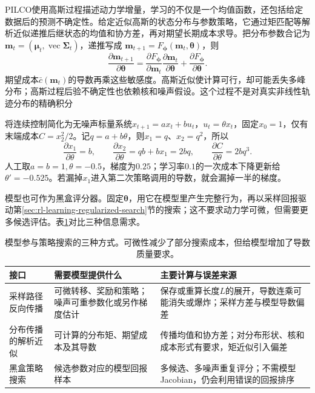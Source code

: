 PILCO使用高斯过程描述动力学增量，学习的不仅是一个均值函数，还包括给定数据后的预测不确定性。给定近似高斯的状态分布与参数策略，它通过矩匹配等解析近似递推后继状态的均值和协方差，再对期望长期成本求导。把分布参数合记为
$\bm m_t=(\bm\mu_t,\operatorname{vec}\bm\Sigma_t)$，递推写成
$\bm m_{t+1}=F_{\bm\phi}(\bm m_t,\bm\theta)$，则
\[
 \frac{\partial\bm m_{t+1}}{\partial\bm\theta}
  =\frac{\partial F_{\bm\phi}}{\partial\bm m_t}
       \frac{\partial\bm m_t}{\partial\bm\theta}
       +\frac{\partial F_{\bm\phi}}{\partial\bm\theta}.
\]
期望成本$\bar c(\bm m_t)$的导数再乘这些敏感度。高斯近似使计算可行，却可能丢失多峰分布；高斯过程后验不确定性也依赖核和噪声假设。这个过程不是对真实非线性轨迹分布的精确积分

\begin{example}[两步模型梯度]
  \label{ex:rl-learning-two-step-gradient}
  将连续控制简化为无噪声标量系统$x_{t+1}=ax_t+bu_t$，$u_t=\theta x_t$，固定$x_0=1$，仅有末端成本$C=x_2^2/2$。记$q=a+b\theta$，则$x_1=q$、$x_2=q^2$，所以
  \[
    \frac{\partial x_1}{\partial\theta}=b,\qquad
    \frac{\partial x_2}{\partial\theta}
       =q b+b x_1=2bq,\qquad
    \frac{\partial C}{\partial\theta}=2bq^3.
  \]
  人工取$a=b=1,\theta=-0.5$，梯度为$0.25$；学习率$0.1$的一次成本下降更新给$\theta'=-0.525$。若漏掉$x_1$进入第二次策略调用的导数，就会漏掉一半的梯度。
\end{example}

模型也可作为黑盒评分器。固定$\bm\theta$，用它在模型里产生完整行为，再以采样回报驱动第\ref{sec:rl-learning-regularized-search}节的搜索；这不要求动力学可微，但需要更多候选评估。表\ref{tab:rl-learning-model-gradient-interfaces}对比三种信息需求。

\begin{table}[t]
  \centering
  \small
  \begin{tabularx}{\linewidth}{>{\raggedright\arraybackslash}p{25mm} >{\raggedright\arraybackslash}X >{\raggedright\arraybackslash}X}
    \toprule
    接口 & 需要模型提供什么 & 主要计算与误差来源 \\
    \midrule
    采样路径反向传播 & 可微转移、奖励和策略；噪声可重参数化或另作梯度估计 & 保存或重算长度$L$的展开，导数连乘可能消失或爆炸；采样方差与模型导数偏差 \\
    分布传播的解析近似 & 可计算的分布矩、期望成本及其导数 & 传播均值和协方差；对分布形状、核和成本形式有要求，矩近似引入偏差 \\
    黑盒策略搜索 & 候选参数对应的模型回报样本 & 多候选、多噪声重复评分；不需模型Jacobian，仍会利用错误的回报排序 \\
    \bottomrule
  \end{tabularx}
  \caption{模型参与策略搜索的三种方式。可微性减少了部分搜索成本，但给模型增加了导数质量要求。}
  \label{tab:rl-learning-model-gradient-interfaces}
\end{table}

